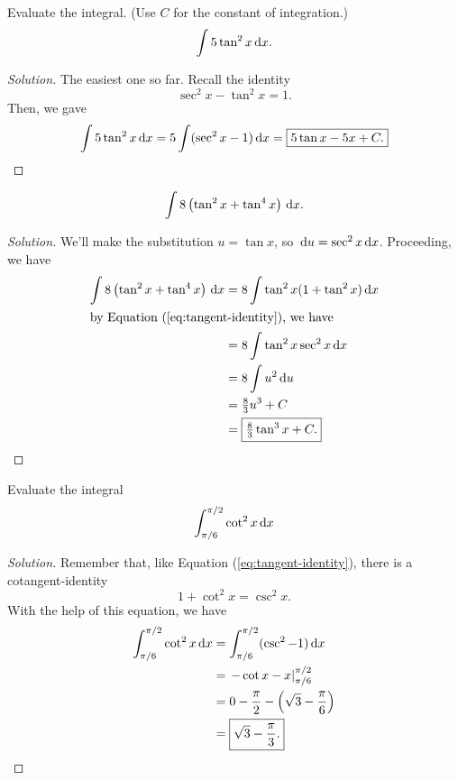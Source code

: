 \begin{problem}[WebAssign HW 10, 5]
Evaluate the integral. (Use $C$ for the constant of integration.)
\[
\int 5\tan^2 x\,\mathrm{d} x.
\]
\end{problem}
\begin{proof}[Solution]
The easiest one so far. Recall the identity
\begin{equation}
  \label{eq:tangent-identity}
\sec^2 x -\tan^2 x =1.
\end{equation}
Then, we gave
\[
\int 5\tan^2x\,\mathrm{d} x=5\int(\sec^2 x -1)\,\mathrm{d} x =
\boxed{5\tan x -5 x +C.}
\]
\end{proof}

\begin{problem}[WebAssign HW 10, 6]
\[
\int 8\left(\tan^2x+\tan^4x\right)\,\mathrm{d} x.
\]
\end{problem}
\begin{proof}[Solution]
We'll make the substitution $u=\tan x$, so $\,\mathrm{d} u=\sec^2x\,\mathrm{d}
x$. Proceeding, we have
\begin{align*}
\int 8\left(\tan^2 x+\tan^4x\right)\,\mathrm{d} x
&=8\int\tan^2 x(1+\tan^2 x)\,\mathrm{d} x\\
\shortintertext{by Equation (\ref{eq:tangent-identity}), we have}
&=8\int\tan^2 x\sec^2 x\,\mathrm{d} x\\
&=8\int u^2\,\mathrm{d} u\\
&=\tfrac{8}{3}u^3+C\\
&=\boxed{\tfrac{8}{3}\tan^3 x+C.}
\end{align*}
\end{proof}

\begin{problem}[WebAssign HW 10, 7]
Evaluate the integral
\[
\int_{\pi/6}^{\pi/2}\cot^2 x\,\mathrm{d} x
\]
\end{problem}
\begin{proof}[Solution]
Remember that, like Equation (\ref{eq:tangent-identity}), there is a
cotangent-identity
\begin{equation}
  \label{eq:cotangent-identity}
1+\cot^2 x=\csc^2 x.
\end{equation}
With the help of this equation, we have
\begin{align*}
\int_{\pi/6}^{\pi/2}\cot^2 x\,\mathrm{d} x&=
\int_{\pi/6}^{\pi/2}(\csc^2-1)\,\mathrm{d} x\\
&=\left.-\cot x-x\right|_{\pi/6}^{\pi/2}\\
&=0-\frac{\pi}{2}-\left(\sqrt{3}-\frac{\pi}{6}\right)\\
&=\boxed{\sqrt{3}-\frac{\pi}{3}.}
\end{align*}
\end{proof}

